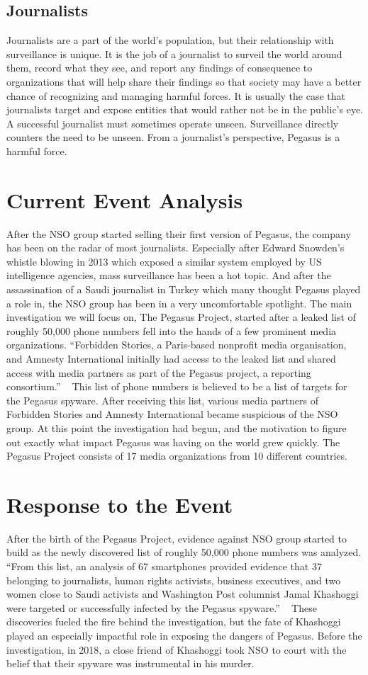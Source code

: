 \documentclass[sigconf]{acmart}
\begin{document}
\subsection{Journalists}
Journalists are a part of the world’s population, but their relationship with surveillance is unique. It is the job of a journalist to surveil the world around them, record what they see, and report any findings of consequence to organizations that will help share their findings so that society may have a better chance of recognizing and managing harmful forces. It is usually the case that journalists target and expose entities that would rather not be in the public’s eye. A successful journalist must sometimes operate unseen. Surveillance directly counters the need to be unseen. From a journalist’s perspective, Pegasus is a harmful force.
\section{Current Event Analysis}
After the NSO group started selling their first version of Pegasus, the company has been on the radar of most journalists. Especially after Edward Snowden’s whistle blowing in 2013 which exposed a similar system employed by US intelligence agencies, mass surveillance has been a hot topic. And after the assassination of a Saudi journalist in Turkey which many thought Pegasus played a role in, the NSO group has been in a very uncomfortable spotlight. The main investigation we will focus on, The Pegasus Project, started after a leaked list of roughly 50,000 phone numbers fell into the hands of a few prominent media organizations. “Forbidden Stories, a Paris-based nonprofit media organisation, and Amnesty International initially had access to the leaked list and shared access with media partners as part of the Pegasus project, a reporting consortium.” ~\cite{used_second(4)} This list of phone numbers is believed to be a list of targets for the Pegasus spyware. After receiving this list, various media partners of Forbidden Stories and Amnesty International became suspicious of the NSO group. At this point the investigation had begun, and the motivation to figure out exactly what impact Pegasus was having on the world grew quickly. The Pegasus Project consists of 17 media organizations from 10 different countries.
\section{Response to the Event}
After the birth of the Pegasus Project, evidence against NSO group started to build as the newly discovered list of roughly 50,000 phone numbers was analyzed. “From this list, an analysis of 67 smartphones provided evidence that 37 belonging to journalists, human rights activists, business executives, and two women close to Saudi activists and Washington Post columnist Jamal Khashoggi were targeted or successfully infected by the Pegasus spyware.” ~\cite{used_third(2)} These discoveries fueled the fire behind the investigation, but the fate of Khashoggi played an especially impactful role in exposing the dangers of Pegasus. Before the investigation, in 2018, a close friend of Khashoggi took NSO to court with the belief that their spyware was instrumental in his murder.
\end{document}
